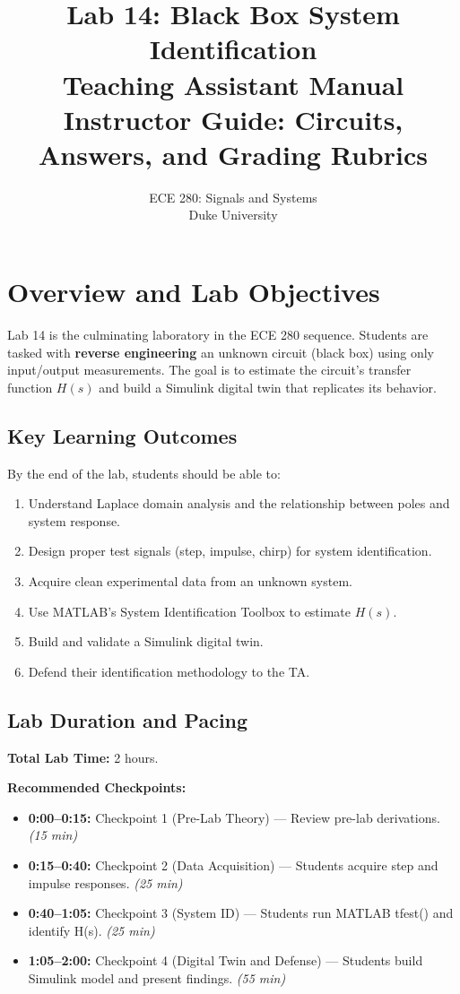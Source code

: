 \documentclass[11pt,letterpaper]{article}
\title{\textbf{Lab 14: Black Box System Identification}\\[0.3cm]
       \Large Teaching Assistant Manual\\
       \large Instructor Guide: Circuits, Answers, and Grading Rubrics}
\author{ECE 280: Signals and Systems\\Duke University}
\date{}
\begin{document}
\maketitle

\tableofcontents
\clearpage

\section{Overview and Lab Objectives}

Lab 14 is the culminating laboratory in the ECE 280 sequence. Students are tasked with \textbf{reverse engineering} an unknown circuit (black box) using only input/output measurements. The goal is to estimate the circuit's transfer function $H(s)$ and build a Simulink digital twin that replicates its behavior.

\subsection{Key Learning Outcomes}

By the end of the lab, students should be able to:
\begin{enumerate}
    \item Understand Laplace domain analysis and the relationship between poles and system response.
    \item Design proper test signals (step, impulse, chirp) for system identification.
    \item Acquire clean experimental data from an unknown system.
    \item Use MATLAB's System Identification Toolbox to estimate $H(s)$.
    \item Build and validate a Simulink digital twin.
    \item Defend their identification methodology to the TA.
\end{enumerate}

\subsection{Lab Duration and Pacing}

\textbf{Total Lab Time:} 2 hours.

\noindent
\textbf{Recommended Checkpoints:}
\begin{itemize}
    \item \textbf{0:00--0:15:} Checkpoint 1 (Pre-Lab Theory) — Review pre-lab derivations. \textit{(15 min)}
    \item \textbf{0:15--0:40:} Checkpoint 2 (Data Acquisition) — Students acquire step and impulse responses. \textit{(25 min)}
    \item \textbf{0:40--1:05:} Checkpoint 3 (System ID) — Students run MATLAB tfest() and identify H(s). \textit{(25 min)}
    \item \textbf{1:05--2:00:} Checkpoint 4 (Digital Twin and Defense) — Students build Simulink model and present findings. \textit{(55 min)}
\end{itemize}
\end{document}
